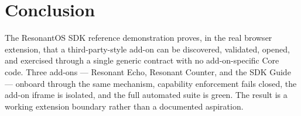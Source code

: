 \documentclass[11pt]{article}
\begin{document}
\section{Conclusion}

The ResonantOS SDK reference demonstration proves, in the real browser
extension, that a third-party-style add-on can be discovered, validated, opened,
and exercised through a single generic contract with no add-on-specific Core
code. Three add-ons --- Resonant Echo, Resonant Counter, and the SDK Guide ---
onboard through the same mechanism, capability enforcement fails closed, the
add-on iframe is isolated, and the full automated suite is green. The result is
a working extension boundary rather than a documented aspiration.
\end{document}
